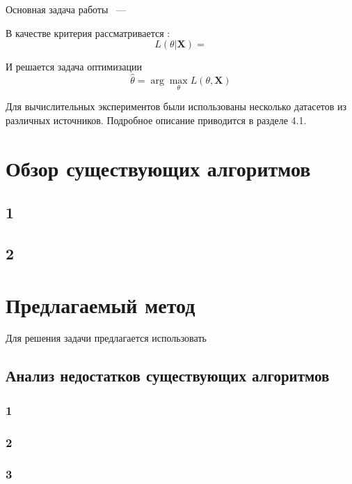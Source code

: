 \documentclass[12pt]{article}
\newcommand{\X}{\mathbf{X}}
\begin{document}
Основная задача работы ~--- 



В качестве критерия рассматривается :
$$ L(\theta|\X) =  $$

И решается задача оптимизации
$$\hat{\theta} = \arg\max_{\theta} L(\theta, \X)$$




Для вычислительных экспериментов были использованы несколько датасетов из различных источников. Подробное описание приводится в разделе 4.1.


\newpage
\section{Обзор существующих алгоритмов }
\subsection{1}

\subsection{2}


\newpage
\section{Предлагаемый метод}
Для решения задачи предлагается использовать

\subsection{Анализ недостатков существующих алгоритмов}
\subsubsection{1}

\subsubsection{2}

\subsubsection{3}
\end{document}
